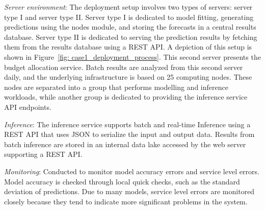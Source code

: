 \textit{Server environment}: The deployment setup involves two types of servers: server type I and server type II. Server type I is dedicated to model fitting, generating predictions using the nodes module, and storing the forecasts in a central results database. Server type II is dedicated to serving the prediction results by fetching them from the results database using a REST API. A depiction of this setup is shown in Figure~\ref{fig: case1_deployment_process}. This second server presents the budget allocation service. Batch results are analyzed from this second server daily, and the underlying infrastructure is based on 25 computing nodes. These nodes are separated into a group that performs modelling and inference workloads, while another group is dedicated to providing the inference service API endpoints.

\textit{Inference}: The inference service supports batch and real-time Inference using a REST API that uses JSON to serialize the input and output data. Results from batch inference are stored in an internal data lake accessed by the web server supporting a REST API.

\textit{Monitoring}: Conducted to monitor model accuracy errors and service level errors. Model accuracy is checked through local quick checks, such as the standard deviation of predictions. Due to many models, service level errors are monitored closely because they tend to indicate more significant problems in the system.



